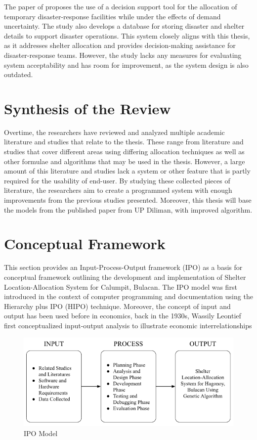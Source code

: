 	 The paper of \textcite{Cavdur2019} proposes the use of a decision support tool for the allocation of temporary disaster-response facilities while under the effects of demand uncertainty. The study also develops a database for storing disaster and shelter details to support disaster operations. This system closely aligns with this thesis, as it addresses shelter allocation and provides decision-making assistance for disaster-response teams. However, the study lacks any measures for evaluating system acceptability and has room for improvement, as the system design is also outdated.

\section{Synthesis of the Review}
	Overtime, the researchers have reviewed and analyzed multiple academic literature and studies that relate to the thesis. These range from literature and studies that cover different areas using differing allocation techniques as well as other formulae and algorithms that may be used in the thesis. However, a large amount of this literature and studies lack a system or other feature that is partly required for the usability of end-user. By studying these collected pieces of literature, the researchers aim to create a programmed system with enough improvements from the previous studies presented. Moreover, this thesis will base the models from the published paper from UP Diliman, with improved algorithm.

\section{Conceptual Framework}
	This section provides an Input-Process-Output framework (IPO) as a basis for conceptual framework outlining the development and implementation of Shelter Location-Allocation System for Calumpit, Bulacan. The IPO model was first introduced in the context of computer programming and documentation using the Hierarchy plus IPO (HIPO) technique. Moreover, the concept of input and output has been used before in economics, back in the 1930s, Wassily Leontief first conceptualized input-output analysis to illustrate economic interrelationships
	
	 \begin{figure}[h!]
		\centering
		\caption{IPO Model} \label{fig:ipo}
		\includegraphics[width=\linewidth]{IPO}
	\end{figure}
	

